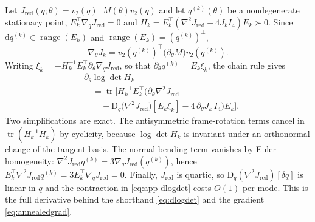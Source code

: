 Let $J_{\mathrm{red}}(q;\theta)=v_2(q)^\top M(\theta)v_2(q)$ and let $q^{(k)}(\theta)$ be a nondegenerate stationary point, $E_k^\top\nabla_qJ_{\mathrm{red}}=0$ and $H_k=E_k^\top(\nabla^2J_{\mathrm{red}}-4J_kI_4)E_k\succ0$. Since $\mathrm{d}q^{(k)}\in\operatorname{range}(E_k)$ and $\operatorname{range}(E_k)=(q^{(k)})^\perp$,
\begin{equation}
\nabla_\theta J_k=v_2(q^{(k)})^\top\big(\partial_\theta M\big)v_2(q^{(k)}) .
\label{eq:app-envelope}
\end{equation}
Writing $\xi_k=-H_k^{-1}E_k^\top\partial_\theta\nabla_qJ_{\mathrm{red}}$, so that $\partial_\theta q^{(k)}=E_k\xi_k$, the chain rule gives
\begin{equation}
\begin{split}
&\partial_\theta\log\det H_k\\
&\quad=\operatorname{tr}\!\Big[H_k^{-1}E_k^\top\Big(\partial_\theta\nabla^2J_{\mathrm{red}}\\
&\qquad+\mathrm{D}_q\big(\nabla^2J_{\mathrm{red}}\big)[E_k\xi_k]
-4\,\partial_\theta J_k\,I_4\Big)E_k\Big].
\end{split}
\label{eq:app-dlogdet}
\end{equation}
Two simplifications are exact. The antisymmetric frame-rotation terms cancel in $\operatorname{tr}(H_k^{-1}\dot H_k)$ by cyclicity, because $\log\det H_k$ is invariant under an orthonormal change of the tangent basis. The normal bending term vanishes by Euler homogeneity: $\nabla^2J_{\mathrm{red}}q^{(k)}=3\nabla_qJ_{\mathrm{red}}(q^{(k)})$, hence $E_k^\top\nabla^2J_{\mathrm{red}}q^{(k)}=3E_k^\top\nabla_qJ_{\mathrm{red}}=0$. Finally, $J_{\mathrm{red}}$ is quartic, so $\mathrm{D}_q(\nabla^2J_{\mathrm{red}})[\delta q]$ is linear in $q$ and the contraction in \eqref{eq:app-dlogdet} costs $O(1)$ per mode. This is the full derivative behind the shorthand \eqref{eq:dlogdet} and the gradient \eqref{eq:annealedgrad}.
